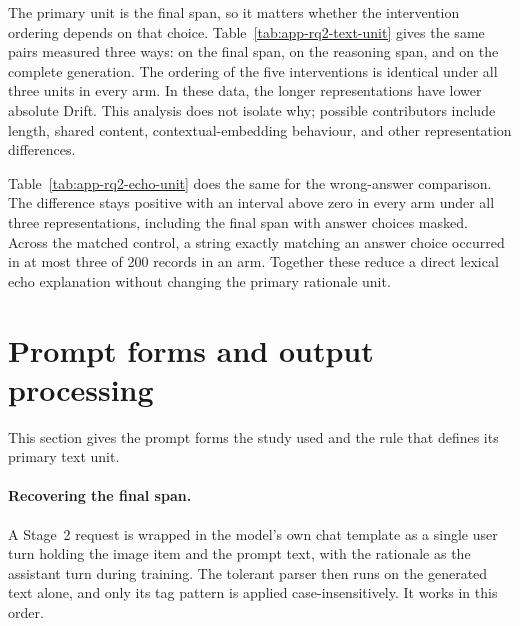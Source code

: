 The primary unit is the final span, so it matters whether the intervention
ordering depends on that choice. Table~\ref{tab:app-rq2-text-unit} gives the
same pairs measured three ways: on the final span, on the reasoning span, and on
the complete generation. The ordering of the five interventions is identical
under all three units in every arm. In these data, the longer representations
have lower absolute Drift. This analysis does not isolate why; possible
contributors include length, shared content, contextual-embedding behaviour,
and other representation differences.

Table~\ref{tab:app-rq2-echo-unit} does the same for the wrong-answer
comparison. The difference stays positive with an interval above zero in every arm
under all three representations, including the final span with answer choices
masked. Across the matched control, a string exactly matching an answer choice occurred in
at most three of 200 records in an arm. Together these reduce a direct lexical echo
explanation without changing the primary rationale unit.



\clearpage

\section{Prompt forms and output processing}
\label{sec:app-prompts}

This section gives the prompt forms the study used and the rule that defines its
primary text unit.



\paragraph{Recovering the final span.}
A Stage~2 request is wrapped in the model's own chat template as a single user
turn holding the image item and the prompt text, with the rationale as the
assistant turn during training. The tolerant parser then runs on the generated
text alone, and only its tag pattern is applied case-insensitively. It works in
this order.

